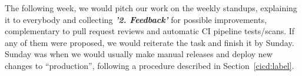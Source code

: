 The following week, we would pitch our work on the weekly standups, explaining it to everybody and collecting \textbf{\textit{'2. Feedback'}} for possible improvements, complementary to pull request reviews and automatic CI pipeline tests/scans. If any of them were proposed, we would reiterate the task and finish it by Sunday. Sunday was when we would usually make manual releases and deploy new changes to “production”, following a procedure described in Section~\ref{cicd:label}.
